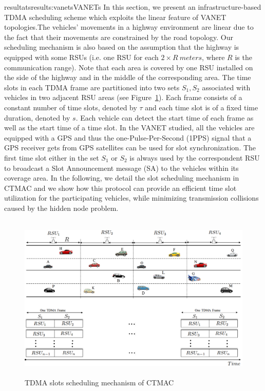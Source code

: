 \documentclass{ra2016}
\begin{document}
\begin{module}{resultats}{results:vanets}{VANETs}
In this section, we present an infrastructure-based TDMA scheduling scheme which exploits the linear feature of VANET topologies.The 
vehicles' movements in a highway environment are linear due to the fact that their movements are constrained by the road topology. Our 
scheduling mechanism is also based on the assumption that the highway is equipped with some RSUs (i.e. one RSU 
for each $2\times R~meters$, where $R$ is the communication range). Note that each area is covered by one RSU installed on 
the side of the highway and in the middle of the corresponding area. The time slots in each TDMA 
frame are partitioned into two sets $S_1, S_2$ associated with vehicles in two adjacent RSU 
areas (see Figure~\ref{fig:CTSA}). Each frame consists of a constant number of time slots, denoted by $\tau$ and each time 
slot is of a fixed time duration, denoted by $s$. Each vehicle can detect the start time of each frame as well as the 
start time of a time slot. In the VANET studied, all the vehicles are equipped with a GPS 
and thus the one-Pulse-Per-Second (1PPS) signal that a GPS receiver gets from GPS satellites can be used for 
slot synchronization. The first time slot either in the set $S_1$ or $S_2$ is always used by the correspondent RSU to
broadcast a Slot Announcement message (SA) to the vehicles within its coverage area. In the following, we detail the slot scheduling mechanism in CTMAC and we show how this protocol can 
provide an efficient time slot utilization for the participating vehicles, while minimizing transmission collisions caused 
by the hidden node problem.

  \begin{figure}[!htbp]
  \begin{center}
 \includegraphics[height=8cm,width=14cm]{IMG/CTMACprinciple.png}
 \caption{TDMA slots scheduling mechanism of CTMAC}
 \label{fig:CTSA}
  \end{center}
\end{figure}



\end{module}
\end{document}
